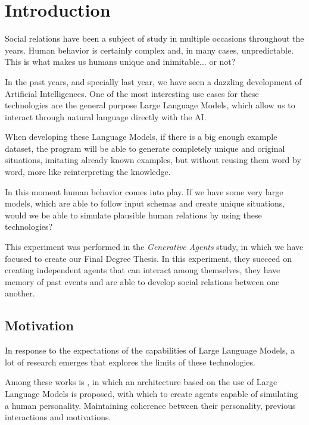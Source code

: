 \chapter*{Introduction}
\label{cap:introduction}


Social relations have been a subject of study in multiple occasions throughout the years. Human behavior is certainly complex and, in many cases, unpredictable. This is what makes us humans unique and inimitable... or not?

In the past years, and specially last year, we have seen a dazzling development of Artificial Intelligences. One of the most interesting use cases for these technologies are the general purpose Large Language Models, which allow us to interact through natural language directly with the AI.

When developing these Language Models, if there is a big enough example dataset, the program will be able to generate completely unique and original situations, imitating already known examples, but without reusing them word by word, more like reinterpreting the knowledge.

In this moment human behavior comes into play. If we have some very large models, which are able to follow input schemas and create unique situations, would we be able to simulate plausible human relations by using these technologies?

This experiment was performed in the \textit{Generative Agents} study, in which we have focused to create our Final Degree Thesis. In this experiment, they succeed on creating independent agents that can interact among themselves, they have memory of past events and are able to develop social relations between one another.

\section{Motivation}
In response to the expectations of the capabilities of Large Language Models, a lot of research emerges that explores the limits of these technologies.

Among these works is \ga, in which an architecture based on the use of Large Language Models is proposed, with which to create agents capable of simulating a human personality. Maintaining coherence between their personality, previous interactions and motivations.

